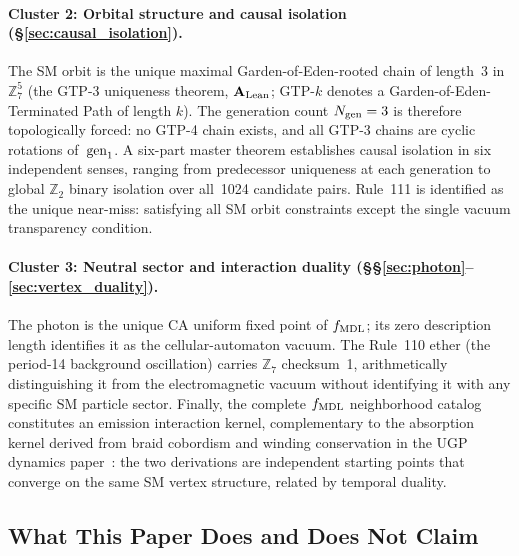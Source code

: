 \documentclass[11pt]{article}
\theoremstyle{remark}
\newcommand{\Ngen}{N_{\rm gen}}
\newcommand{\CatAL}{\ensuremath{\textbf{A}_{\rm Lean}}}
\begin{document}
\paragraph{Cluster 2: Orbital structure and causal isolation
(\S\ref{sec:causal_isolation}).}
The SM orbit is the unique maximal Garden-of-Eden-rooted chain of length~3
in $\mathbb{Z}_7^5$ (the GTP-3 uniqueness theorem, $\CatAL$; GTP-$k$ denotes a
Garden-of-Eden-Terminated Path of length $k$).
The generation count $\Ngen = 3$ is therefore topologically forced: no
GTP-4 chain exists, and all GTP-3 chains are cyclic rotations of~${\rm gen}_1$.
A six-part master theorem establishes causal isolation in six independent
senses, ranging from predecessor uniqueness at each generation to global
$\mathbb{Z}_2$ binary isolation over all~1024 candidate pairs.
Rule~111 is identified as the unique near-miss: satisfying all SM orbit
constraints except the single vacuum transparency condition.

\paragraph{Cluster 3: Neutral sector and interaction duality
(\S\S\ref{sec:photon}--\ref{sec:vertex_duality}).}
The photon is the unique CA uniform fixed point of $f_{\rm MDL}$; its
zero description length identifies it as the cellular-automaton vacuum.
The Rule~110 ether (the period-14 background oscillation) carries
$\mathbb{Z}_7$ checksum~1, arithmetically distinguishing it from the
electromagnetic vacuum without identifying it with any specific SM
particle sector.
Finally, the complete $f_{\rm MDL}$ neighborhood catalog constitutes an
emission interaction kernel, complementary to the absorption kernel derived
from braid cobordism and winding conservation in the UGP dynamics
paper~\cite{Spivack2026_UGPDynamics}: the two derivations are independent
starting points that converge on the same SM vertex structure, related by
temporal duality.

\subsection{What This Paper Does and Does Not Claim}
\end{document}
